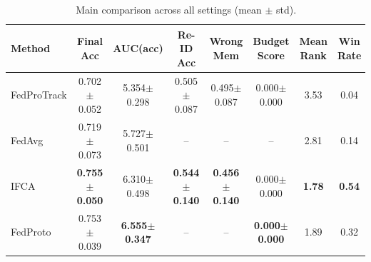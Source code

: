 \begin{table}[t]
\centering
\caption{Main comparison across all settings (mean $\pm$ std).}
\label{tab:main}
\begin{tabular}{lccccccc}
\toprule
Method & Final Acc & AUC(acc) & Re-ID Acc & Wrong Mem & Budget Score & Mean Rank & Win Rate \\
\midrule
FedProTrack & 0.702$\pm$0.052 & 5.354$\pm$0.298 & 0.505$\pm$0.087 & 0.495$\pm$0.087 & 0.000$\pm$0.000 & 3.53 & 0.04 \\
FedAvg & 0.719$\pm$0.073 & 5.727$\pm$0.501 & -- & -- & -- & 2.81 & 0.14 \\
IFCA & \textbf{0.755$\pm$0.050} & 6.310$\pm$0.498 & \textbf{0.544$\pm$0.140} & \textbf{0.456$\pm$0.140} & 0.000$\pm$0.000 & \textbf{1.78} & \textbf{0.54} \\
FedProto & 0.753$\pm$0.039 & \textbf{6.555$\pm$0.347} & -- & -- & \textbf{0.000$\pm$0.000} & 1.89 & 0.32 \\
\bottomrule
\end{tabular}
\end{table}